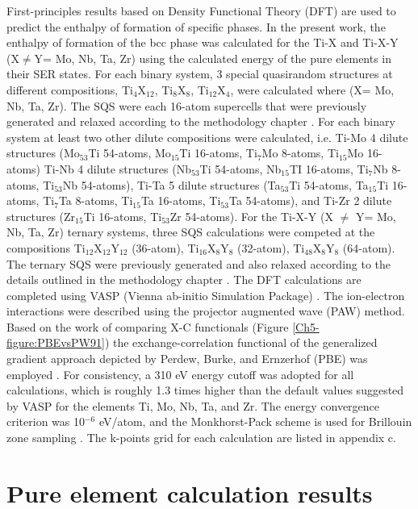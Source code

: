 First-principles results based on Density Functional Theory (DFT) are used to predict the enthalpy of formation of specific phases. In the present work, the enthalpy of formation of the bcc phase was calculated for the Ti-X and Ti-X-Y (X$\neq$Y= Mo, Nb, Ta, Zr) using the calculated energy of the pure elements in their SER states. For each binary system, 3 special quasirandom structures at different compositions, Ti$_4$X$_{12}$, Ti$_{8}$X$_{8}$, Ti$_{12}$X$_{4}$, were calculated where (X= Mo, Nb, Ta, Zr). The SQS were each 16-atom supercells that were previously generated and relaxed according to the methodology chapter \cite{Jiang2004}. For each binary system at least two other dilute compositions were calculated, i.e. Ti-Mo 4 dilute structures (Mo$_{53}$Ti 54-atoms, Mo$_{15}$Ti 16-atoms,  Ti$_{7}$Mo 8-atoms, Ti$_{15}$Mo 16-atoms) Ti-Nb 4 dilute structures (Nb$_{53}$Ti 54-atoms, Nb$_{15}$TI 16-atoms, Ti$_{7}$Nb 8-atoms, Ti$_{53}$Nb 54-atoms), Ti-Ta 5 dilute structures (Ta$_{53}$Ti 54-atoms, Ta$_{15}$Ti 16-atoms, Ti$_{7}$Ta 8-atoms, Ti$_{15}$Ta 16-atoms, Ti$_{53}$Ta 54-atoms), and Ti-Zr 2 dilute structures (Zr$_{15}$Ti 16-atoms, Ti$_{53}$Zr 54-atoms). For the Ti-X-Y (X $\neq$ Y= Mo, Nb, Ta, Zr) ternary systems, three SQS calculations were competed at the compositions Ti$_{12}$X$_{12}$Y$_{12}$ (36-atom), Ti$_{16}$X$_{8}$Y$_{8}$ (32-atom), Ti$_{48}$X$_{8}$Y$_{8}$ (64-atom). The ternary SQS were previously generated and also relaxed according to the details outlined in the methodology chapter \cite{Jiang2009}. The DFT calculations are completed using VASP (Vienna ab-initio Simulation Package) \cite{Kresse1996}. The ion-electron interactions were described using the projector augmented wave (PAW) \cite{Kresse1999,Blochl1994} method. Based on the work of comparing X-C functionals (Figure \ref{Ch5-figure:PBEvsPW91}) the exchange-correlation functional of the generalized gradient approach depicted by Perdew, Burke, and Ernzerhof (PBE) was employed \cite{Perdew1996a}. For consistency, a 310 eV energy cutoff was adopted for all calculations, which is roughly 1.3 times higher than the default values suggested by VASP for the elements Ti, Mo, Nb, Ta, and Zr. The energy convergence criterion was 10$^{-6}$ eV/atom, and the Monkhorst-Pack scheme is used for Brillouin zone sampling \cite{Kresse1996,Monkhorst1976a}. The k-points grid for each calculation are listed in appendix c.

\section{Pure element calculation results}

